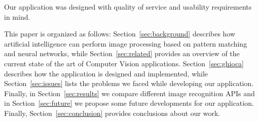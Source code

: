 Our application was designed with quality of service and usability requirements in mind. 

This paper is organized as follows: Section~\ref{sec:background} describes how 
artificial intelligence can perform image processing based on pattern matching 
and neural networks, while Section~\ref{sec:related} provides an overview of 
the current state of the art of Computer Vision applications. 
Section~\ref{sec:ghioca} describes how the application is designed and 
implemented, while Section~\ref{sec:issues} lists the problems we faced while 
developing our application. Finally, in Section~\ref{sec:results} we compare 
different image recognition APIs and in Section~\ref{sec:future} we propose 
some future developments for our application. Finally, Section~\ref{sec:conclusion} 
provides conclusions about our work.
